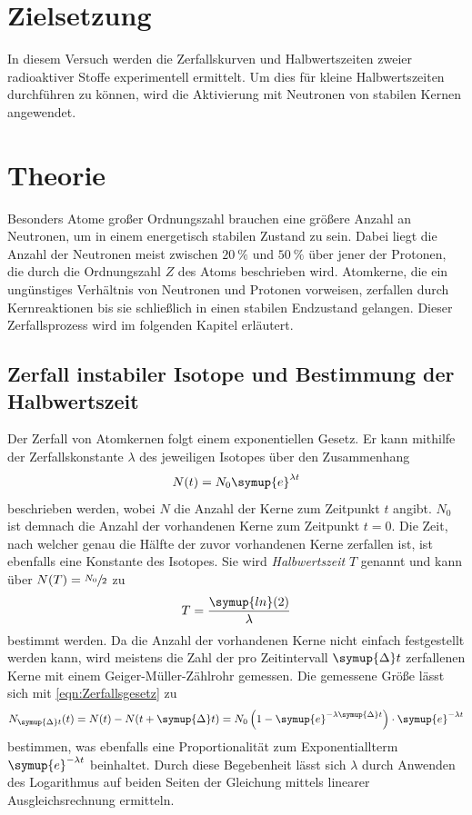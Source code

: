 \section{Zielsetzung}
\label{sec:Ziel}
In diesem Versuch werden die Zerfallskurven und Halbwertszeiten zweier radioaktiver Stoffe experimentell ermittelt. Um dies für kleine Halbwertszeiten durchführen zu können,
wird die Aktivierung mit Neutronen von stabilen Kernen angewendet.

\section{Theorie}
\label{sec:Theorie}
Besonders Atome großer Ordnungszahl brauchen eine größere Anzahl an Neutronen, um in  einem energetisch stabilen Zustand zu sein. Dabei liegt die Anzahl der Neutronen meist 
zwischen $\qty{20}{\percent}$ und $\qty{50}{\percent}$ über jener der Protonen, die durch die Ordnungszahl $Z$ des Atoms beschrieben wird.
Atomkerne, die ein ungünstiges Verhältnis von Neutronen und Protonen vorweisen, zerfallen durch Kernreaktionen bis sie schließlich in einen stabilen Endzustand gelangen.
Dieser Zerfallsprozess wird im folgenden Kapitel erläutert.

\subsection{Zerfall instabiler Isotope und Bestimmung der Halbwertszeit}
\label{subsec:Zerfall}
Der Zerfall von Atomkernen folgt einem exponentiellen Gesetz. Er kann mithilfe der Zerfallskonstante $\lambda$ des jeweiligen Isotopes über den Zusammenhang
\begin{equation}
    \label{eqn:Zerfallsgesetz}
    N(t)= N_0 \symup{e}^{\lambda t}
\end{equation}
beschrieben werden, wobei $N$ die Anzahl der Kerne zum Zeitpunkt $t$ angibt. $N_0$ ist demnach die Anzahl der vorhandenen Kerne zum Zeitpunkt $t=0$. 
Die Zeit, nach welcher genau die Hälfte der zuvor vorhandenen Kerne zerfallen ist, ist ebenfalls eine Konstante des Isotopes. Sie wird \textit{Halbwertszeit} $T$
genannt und kann über $N(T) = \sfrac{N_0}{2}$ zu 
\begin{equation}
    \label{eqn:Halbwertszeit}
    T = \frac{\symup{ln}(2)}{\lambda}
\end{equation}
bestimmt werden.
Da die Anzahl der vorhandenen Kerne nicht einfach festgestellt werden kann, wird meistens die Zahl der pro Zeitintervall $\symup{\Delta}t$ zerfallenen Kerne mit einem 
Geiger-Müller-Zählrohr gemessen. Die gemessene Größe lässt sich mit \autoref{eqn:Zerfallsgesetz} zu
\begin{equation}
    \label{eqn:N_dt}
    N_{\symup{\Delta}t}(t) = N(t)-N(t+ \symup{\Delta}t) = N_0 \left(1- \symup{e}^{-\lambda \symup{\Delta}t}\right) \cdot \symup{e}^{-\lambda t}
\end{equation}
bestimmen, was ebenfalls eine Proportionalität zum Exponentiallterm $\symup{e}^{-\lambda t}$ beinhaltet.
Durch diese Begebenheit lässt sich $\lambda$ durch Anwenden des Logarithmus auf beiden Seiten der Gleichung mittels linearer Ausgleichsrechnung ermitteln.

